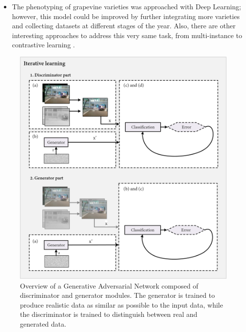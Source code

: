 \begin{itemize}
    \item The phenotyping of grapevine varieties was approached with Deep Learning; however, this model could be improved by further integrating more varieties and collecting datasets at different stages of the year. Also, there are other interesting approaches to address this very same task, from multi-instance \cite{meerdink_multitarget_2022} to contrastive learning \cite{guan_spatial-spectral_2022}. 
\end{itemize}

\begin{figure}[H]
    \centering
    \includegraphics[width=\linewidth]{figs/conclusions/gan.png}
    \caption{Overview of a Generative Adversarial Network composed of discriminator and generator modules. The generator is trained to produce realistic data as similar as possible to the input data, while the discriminator is trained to distinguish between real and generated data.}
    \label{fig:conclusions_gan}
\end{figure}